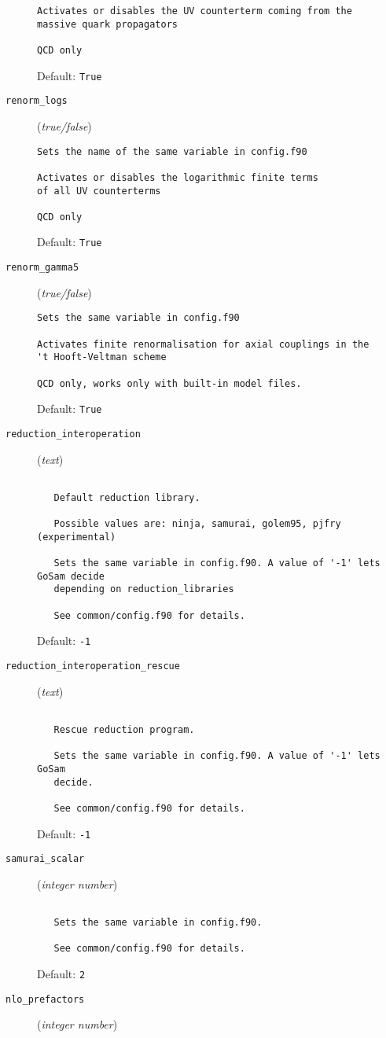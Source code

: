 \begin{description}
\begin{verbatim}
Activates or disables the UV counterterm coming from the
massive quark propagators

QCD only
\end{verbatim}
Default: \verb|True|
\item[\texttt{renorm\_logs}] (\textit{true/false})
\begin{verbatim}
Sets the name of the same variable in config.f90

Activates or disables the logarithmic finite terms
of all UV counterterms

QCD only
\end{verbatim}
Default: \verb|True|
\item[\texttt{renorm\_gamma5}] (\textit{true/false})
\begin{verbatim}
Sets the same variable in config.f90

Activates finite renormalisation for axial couplings in the
't Hooft-Veltman scheme

QCD only, works only with built-in model files.
\end{verbatim}
Default: \verb|True|
\item[\texttt{reduction\_interoperation}] (\textit{text})
\begin{verbatim}

   Default reduction library.

   Possible values are: ninja, samurai, golem95, pjfry (experimental)

   Sets the same variable in config.f90. A value of '-1' lets GoSam decide
   depending on reduction_libraries

   See common/config.f90 for details.
\end{verbatim}
Default: \verb|-1|
\item[\texttt{reduction\_interoperation\_rescue}] (\textit{text})
\begin{verbatim}

   Rescue reduction program.

   Sets the same variable in config.f90. A value of '-1' lets GoSam
   decide.

   See common/config.f90 for details.
\end{verbatim}
Default: \verb|-1|
\item[\texttt{samurai\_scalar}] (\textit{integer number})
\begin{verbatim}

   Sets the same variable in config.f90.

   See common/config.f90 for details.
\end{verbatim}
Default: \verb|2|
\item[\texttt{nlo\_prefactors}] (\textit{integer number})
\begin{verbatim}


\end{verbatim}
\end{description}
